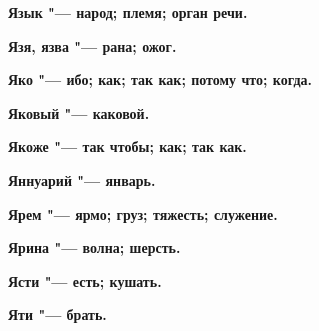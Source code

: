 \bfseries Язык \normalfont{} "--- народ; племя; орган речи. 




\bfseries Язя, язва \normalfont{} "--- рана; ожог. 




\bfseries Яко \normalfont{} "--- ибо; как; так как; потому что; когда. 




\bfseries Яковый \normalfont{} "--- каковой. 




\bfseries Якоже \normalfont{} "--- так чтобы; как; так как. 




\bfseries Яннуарий \normalfont{} "--- январь. 




\bfseries Ярем \normalfont{} "--- ярмо; груз; тяжесть; служение. 




\bfseries Ярина \normalfont{} "--- волна; шерсть. 




\bfseries Ясти \normalfont{} "--- есть; кушать. 




\bfseries Яти \normalfont{} "--- брать. 




 

